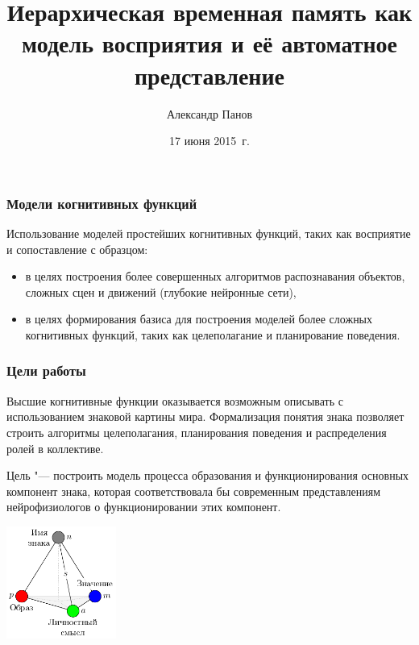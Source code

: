 \documentclass[default]{beamer}
\begin{document}
	
	\title[Perception and HTM]{Иерархическая временная память как модель восприятия и её автоматное представление}
	\author[Панов]{Александр Панов}
	\date{17 июня 2015~г.} 
	
	\begin{frame}
		\titlepage
	\end{frame}
	
	\begin{frame}
		\frametitle{Модели когнитивных функций}
		
		Использование моделей простейших когнитивных функций, таких как восприятие и сопоставление с образцом:
		\begin{itemize}
			\item в целях построения более совершенных алгоритмов распознавания объектов, сложных сцен и движений (глубокие нейронные сети),
			\item в целях формирования базиса для построения моделей более сложных когнитивных функций, таких как целеполагание и планирование поведения.
		\end{itemize}
	\end{frame}

	\begin{frame}
		\frametitle{Цели работы}
		
		Высшие когнитивные функции оказывается возможным описывать с использованием знаковой картины мира. Формализация понятия знака позволяет строить алгоритмы целеполагания, планирования поведения и распределения ролей в коллективе.
		\par\bigskip
		Цель "--- построить модель процесса образования и функционирования основных компонент знака, которая соответствовала бы современным представлениям нейрофизиологов о функционировании этих компонент.
		\begin{center}
			\includegraphics[width=0.27\textwidth]{signs/sign_colored}
		\end{center}
		
	\end{frame}
\end{document}
